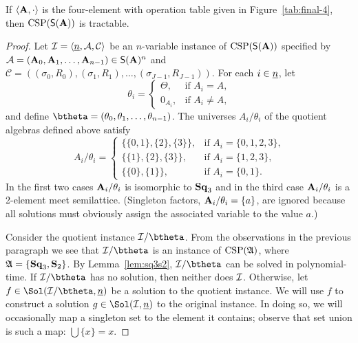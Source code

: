 \begin{example}
\begin{proposition}
  If $\langle\mathbf{A}, \cdot\rangle$ is the four-element \cib with operation table given in Figure~\ref{tab:final-4},
  then $\operatorname{CSP}(\mathsf{S}(\mathbf{A}))$ is tractable.
\end{proposition}
\begin{proof}
  Let $\mathcal{I} = \langle\underline{n}, \mathcal{A}, \mathcal{C}\rangle$ be an $n$-variable instance of $\operatorname{CSP}(\mathsf{S}(\mathbf{A}))$
  specified by $\mathcal{A} = (\mathbf{A}_0, \mathbf{A}_1, \dots, \mathbf{A}_{n-1}) \in \mathsf{S}(\mathbf{A})^n$ and  
  $\mathcal C = ((\sigma_0, R_0), (\sigma_1, R_1), \dots, (\sigma_{J-1}, R_{J-1}))$.
  For each $i \in \underline{n}$, let
  \begin{equation}
    \label{eq:90}
  \theta_i = 
  \begin{cases}
    \Theta, & \text{if $A_i = A$,}\\
    0_{A_i}, & \text{if $A_i \neq A$,}
  \end{cases}
  \end{equation}
  and define $\btheta = (\theta_0, \theta_1, \dots, \theta_{n-1})$.
  The universes $A_i/\theta_i$ of the quotient algebras defined above satisfy
  \begin{equation*}
  A_i/\theta_i = 
  \begin{cases}
    \{\{0,1\}, \{2\}, \{3\}\},  & \text{if $A_i = \{0,1,2,3\}$,}\\
    \{\{1\},\{2\},\{3\}\}, & \text{if $A_i = \{1,2,3\}$,}\\
    \{\{0\},\{1\}\}, & \text{if $A_i = \{0,1\}$.}
  \end{cases}
  \end{equation*}
  In the first two cases $\mathbf{A}_i/\theta_i$ is isomorphic to $\mathbf{Sq}_{3}$ and in the third case 
  $\mathbf{A}_i/\theta_i$ is a 2-element meet semilattice.
  (Singleton factors, $\mathbf{A}_i/\theta_i =\{a\}$, are ignored because all solutions
  must obviously assign the associated variable to the value $a$.)

  Consider the quotient instance $\sI/\btheta$. From the observations in the previous paragraph we see that $\sI/\btheta$ is an instance of $\operatorname{CSP}(\mathfrak A)$, where  $\mathfrak A  = \{\mathbf{Sq}_{3},\mathbf S_2\}$. 
  By Lemma~\ref{lem:sq3s2}, $\sI/\btheta$ can be solved in polynomial-time.
  If $\sI/\btheta$ has no solution, then neither does $\mathcal{I}$.  Otherwise, let
  $f  \in \Sol(\sI/\btheta, \nn)$ be
  a solution to the quotient instance.
    We will use $f$ to construct a solution $g \in \Sol(\sI, \nn)$ to the original
    instance.
  In doing so, we will occasionally map a singleton set to the element it contains; 
  observe that set union is such a map: $\bigcup\{x\} = x$.


\end{proof}
\end{example}
